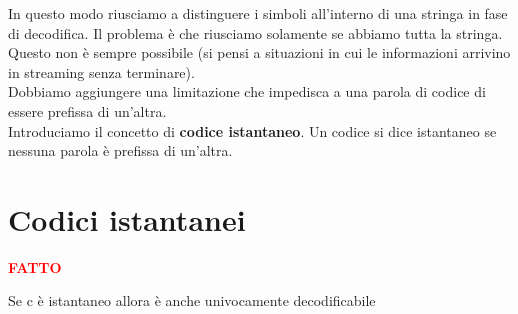 \documentclass[12pt]{report}
\begin{document}
    \noindent In questo modo riusciamo a distinguere i simboli all'interno di una stringa in fase di decodifica. Il problema è che riusciamo solamente se abbiamo tutta la stringa. Questo non è sempre possibile (si pensi a situazioni in cui le informazioni arrivino in streaming senza terminare). \\ Dobbiamo aggiungere una limitazione che impedisca a una parola di codice di essere prefissa di un'altra. \\
    Introduciamo il concetto di \textbf{codice istantaneo}. Un codice si dice istantaneo se nessuna parola è prefissa di un'altra.

    \section{Codici istantanei}

    \vspace{5px}
    \begin{tcolorbox}
        \textbf{\textcolor{red}{FATTO}}
        \begin{center}
            Se c è istantaneo allora è anche univocamente decodificabile
        \end{center}
    \end{tcolorbox}

    \vspace{5px}
\end{document}
